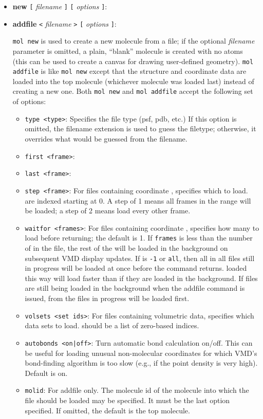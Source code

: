  \begin{itemize}
    \item {\bf new } { {\tt [} {\it filename } {\tt ]} {\tt [} {\it options}
      {\tt ]}}:
    \item {\bf addfile } { {\tt <} {\it filename } {\tt >} {\tt [} {\it options}
      {\tt ]}}:

{\tt mol new} is used to create a new molecule from a file; if the optional
{\it filename} parameter is omitted, a plain, ``blank'' molecule is created with
no atoms (this can be used to create a canvas for drawing user-defined
geometry).  {\tt mol addfile} is like {\tt mol new} except that the structure
and coordinate data are loaded into the top molecule (whichever molecule was
loaded last) instead of creating a new one.  Both {\tt mol new} and 
{\tt mol addfile} accept the following set of options:
\begin{itemize}
  \item {\tt type <type>}: Specifies the file type (psf, pdb, etc.)  If this
  option is omitted, the filename extension is used to guess the filetype; 
  otherwise, it overrides what would be guessed from the filename.
  \item {\tt first <frame>}:
  \item {\tt last <frame>}:
  \item {\tt step <frame>}: For files containing coordinate \timesteps, 
  specifies which \timesteps to load. \Timesteps are indexed starting at 0.
  A step of 1 means all frames in the range will be loaded; a step of 2 means
  load every other frame.  
  \item {\tt waitfor <frames>}: For files containing coordinate \timesteps,
  specifies how many \timesteps to load before returning; the default is 1.
  If {\tt frames} is less than the number of \timesteps in the file, the rest
  of the \timesteps will be loaded in the background on subsequent VMD display
  updates.  If {\tt \timesteps} is
  {\tt -1} or {\tt all}, then all \timesteps in all files still in progress
  will be loaded at once before the command returns. \Timesteps loaded this
  way will load faster than if they are loaded in the background. 
  If files are still being loaded in the background when the addfile command 
  is issued, \timesteps from the files in progress will be loaded first.
  \item {\tt volsets <set ids>}: For files containing volumetric data,
  specifies which data sets to load.  {\tt <set ids>} should be a list of
  zero-based indices.
  \item {\tt autobonds <on|off>}: Turn automatic bond calculation on/off. 
  This can be useful for loading unusual non-molecular coordinates for which VMD's 
  bond-finding algorithm is too slow (e.g., if the point density is very high). 
  Default is on.
  \item {\tt molid}: For addfile only.  The molecule id of the molecule into
  which the file should be loaded may be specified.  It must be the last 
  option specified.  If omitted, the default is the top molecule.
\end{itemize}



\end{itemize}
